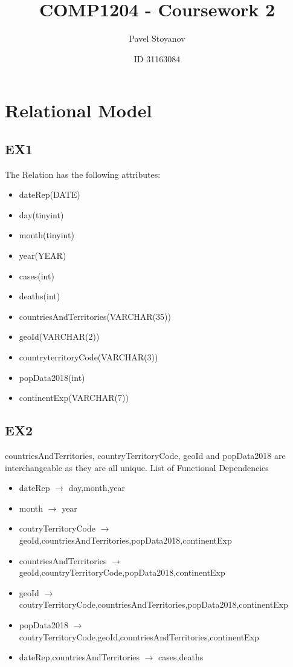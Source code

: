 \documentclass{article}
\title{COMP1204 - Coursework 2}
\author{Pavel Stoyanov}
\date{ID 31163084}
\begin{document}
\maketitle
\section{Relational Model}
\subsection{EX1}
The Relation has the following attributes:
\newline
\begin{itemize}
	\item dateRep(DATE)
	\item day(tinyint)
	\item month(tinyint)
	\item year(YEAR)
	\item cases(int)
	\item deaths(int)
	\item countriesAndTerritories(VARCHAR(35))
	\item geoId(VARCHAR(2))
	\item countryterritoryCode(VARCHAR(3))
	\item popData2018(int)
	\item continentExp(VARCHAR(7))
\end{itemize}
\subsection{EX2}
countriesAndTerritories, countryTerritoryCode, geoId and popData2018 are interchangeable as they are all unique.
List of Functional Dependencies
\begin{itemize}
	\item dateRep $\rightarrow$ day,month,year
	\item month $\rightarrow$ year
	\item coutryTerritoryCode $\rightarrow$ geoId,countriesAndTerritories,popData2018,continentExp
	\item countriesAndTerritories $\rightarrow$ geoId,countryTerritoryCode,popData2018,continentExp
	\item geoId $\rightarrow$ coutryTerritoryCode,countriesAndTerritories,popData2018,continentExp
	\item popData2018 $\rightarrow$ coutryTerritoryCode,geoId,countriesAndTerritories,continentExp
	\item dateRep,countriesAndTerritories $\rightarrow$ cases,deaths
\end{itemize}
\end{document}
